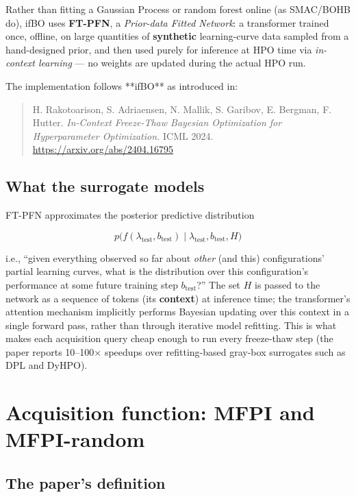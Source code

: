 \documentclass[10pt]{article}
\begin{document}
Rather than fitting a Gaussian Process or random forest online (as SMAC/BOHB do), ifBO
uses \textbf{FT-PFN}, a \textit{Prior-data Fitted Network}: a transformer trained once, offline, on
large quantities of \textbf{synthetic} learning-curve data sampled from a hand-designed
prior, and then used purely for inference at HPO time via \textit{in-context learning} — no
weights are updated during the actual HPO run.

The implementation follows **ifBO** as introduced in:
\begin{quote}
H. Rakotoarison, S. Adriaensen, N. Mallik, S. Garibov, E. Bergman, F. Hutter.
\emph{In-Context Freeze-Thaw Bayesian Optimization for Hyperparameter Optimization.}
ICML 2024. \url{https://arxiv.org/abs/2404.16795}
\end{quote}

\subsection*{What the surrogate models}

FT-PFN approximates the posterior predictive distribution

\begin{equation}
p\big( f(\lambda_\text{test}, b_\text{test}) \mid \lambda_\text{test}, b_\text{test}, H \big)
\end{equation}

i.e., ``given everything observed so far about \emph{other} (and this) configurations'
partial learning curves, what is the distribution over this configuration's performance
at some future training step $b_\text{test}$?'' The set $H$ is passed to the network as a sequence
of tokens (its \textbf{context}) at inference time; the transformer's attention mechanism
implicitly performs Bayesian updating over this context in a single forward pass,
rather than through iterative model refitting. This is what makes each acquisition
query cheap enough to run every freeze-thaw step (the paper reports 10--100$\times$ speedups
over refitting-based gray-box surrogates such as DPL and DyHPO).

\section*{Acquisition function: MFPI and MFPI-random}

\subsection*{The paper's definition}
\end{document}
